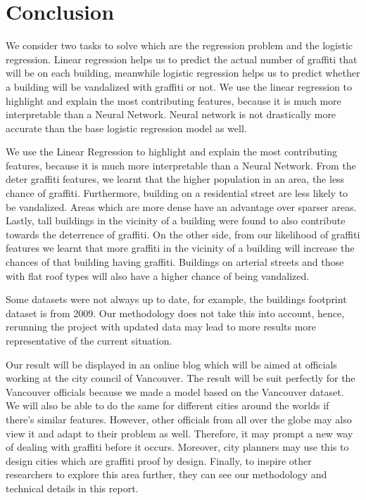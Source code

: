 \chapter{Conclusion}

We consider two tasks to solve which are the regression problem and the logistic regression. Linear regression helps us to predict the actual number of graffiti that will be on each building, meanwhile logistic regression helps us to predict whether a building will be vandalized with graffiti or not. We use the linear regression to highlight and explain the most contributing features, because it is much more interpretable than a Neural Network. Neural network is not drastically more accurate than the base logistic regression model as well.

We use the Linear Regression to highlight and explain the most contributing features, because it is much more interpretable than a Neural Network. From the deter graffiti features, we learnt that the higher population in an area, the less chance of graffiti. Furthermore, building on a residential street are less likely to be vandalized. Areas which are more dense have an advantage over sparser areas. Lastly, tall buildings in the vicinity of a building were found to also contribute towards the deterrence of graffiti. On the other side, from our likelihood of graffiti features we learnt that more graffiti  in the vicinity of a building will increase the chances of that building having graffiti. Buildings on arterial streets and those with flat roof types will also have a higher chance of being vandalized.


Some datasets were not always up to date, for example, the buildings footprint dataset is from 2009. Our methodology does not take this into account, hence, rerunning the project with updated data may lead to more results more representative of the current situation.

Our result will be displayed in an online blog which will be aimed at officials working at the city council of Vancouver. The result will be suit perfectly for the Vancouver officials because we made a model based on the Vancouver dataset. We will also be able to do the same for different cities around the worlds if there’s similar features. However, other officials from all over the globe may also view it and adapt to their problem as well. Therefore, it may prompt a new way of dealing with graffiti before it occurs. Moreover, city planners may use this to design cities which are graffiti proof by design. Finally, to inspire other researchers to explore this area further, they can see our methodology and technical details in this report.